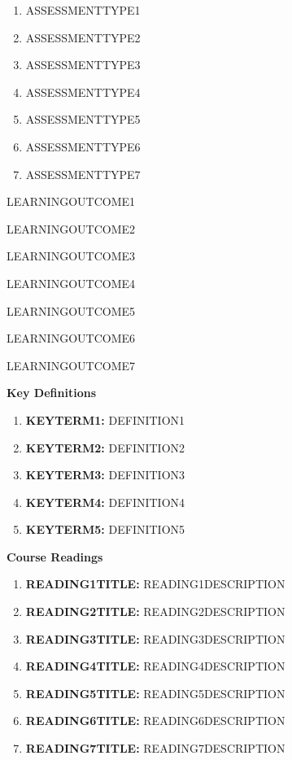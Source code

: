 \documentclass{article}
\begin{document}
\begin{enumerate}
	
\item ASSESSMENTTYPE1
 
\item ASSESSMENTTYPE2
 
\item ASSESSMENTTYPE3
 
\item ASSESSMENTTYPE4
 
 \item ASSESSMENTTYPE5
 
 \item ASSESSMENTTYPE6
 
 \item ASSESSMENTTYPE7
 
\end{enumerate}

LEARNINGOUTCOME1

LEARNINGOUTCOME2

LEARNINGOUTCOME3

LEARNINGOUTCOME4

LEARNINGOUTCOME5

LEARNINGOUTCOME6

LEARNINGOUTCOME7

\pagebreak
 
{\huge \textbf{Key Definitions}}
\begin{enumerate}
	\item \textbf{KEYTERM1:} DEFINITION1
	\item \textbf{KEYTERM2:} DEFINITION2
	\item \textbf{KEYTERM3:} DEFINITION3
	\item \textbf{KEYTERM4:} DEFINITION4
	\item \textbf{KEYTERM5:} DEFINITION5
\end{enumerate}

\pagebreak

{\huge \textbf{Course Readings}}

\begin{enumerate}
	
\item \textbf{READING1TITLE:} READING1DESCRIPTION

\item \textbf{READING2TITLE:} READING2DESCRIPTION

\item \textbf{READING3TITLE:} READING3DESCRIPTION

\item \textbf{READING4TITLE:} READING4DESCRIPTION

\item \textbf{READING5TITLE:} READING5DESCRIPTION

\item \textbf{READING6TITLE:} READING6DESCRIPTION

\item \textbf{READING7TITLE:} READING7DESCRIPTION

\end{enumerate}
\end{document}
